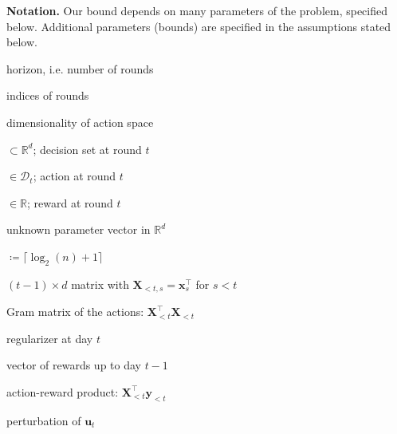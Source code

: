 \documentclass{article}
\renewcommand{\vec}[1]{\bm{#1}}
\newcommand{\defeq}{\coloneq}
\newcommand{\Real}{\mathds{R}}
\newcommand{\D}{\mathcal{D}}
\providecommand\transp{\top}
\let\transpsymbol\transp
\renewcommand{\transp}[1]{#1^\transpsymbol}
\newcommand{\XtX}[1]{\transp{#1}{#1}}
\renewcommand{\paragraph}[1]{\vspace{2pt}\noindent\textbf{#1}}
\begin{document}
\paragraph{Notation.}\label{sec:notation} Our bound depends on many
parameters of the problem, specified below. Additional parameters
(bounds) are specified in the assumptions stated below.
\setlength{\multicolsep}{4.0pt plus 2.0pt minus 1.5pt}
\begin{multicols}{2}[]
  \nolinenumbers
  \begin{description}[style=sameline,leftmargin=2em,nosep]
  \item[$n$] horizon, i.e. number of rounds
  \item[$s,t$] indices of rounds
  \item[$d$] dimensionality of action space
  \item[$\D_t$] $\subset\Real^d$; decision set at round $t$
  \item[$\vec x_t$] $\in \D_t$; action at round $t$ 
  \item[$y_t$] $\in \Real$; reward at round $t$
  \item[$\vec\theta^*$] unknown parameter vector in $\Real^d$
  \item[$m$] $\defeq \lceil\log_2(n)+1 \rceil$
  \item[$\vec X_{<t}$] $(t-1)\times d$ matrix with $\vec X_{<t,s} = \transp{\vec
      x_s}$ for $s<t$
  \item[$\vec G_t$] Gram matrix of the actions: $\XtX{\vec X_{<t}}$
  \item[$\vec H_t$] regularizer at day $t$
  \item[$\vec y_{<t}$] vector of rewards up to day $t-1$
  \item[$\vec u_t$] action-reward product: $\transp{\vec X_{<t}} \vec y_{<t}$
  \item[$\vec h_t$] perturbation of $\vec u_t$
  \end{description}
  \linenumbers
\end{multicols}
\end{document}
